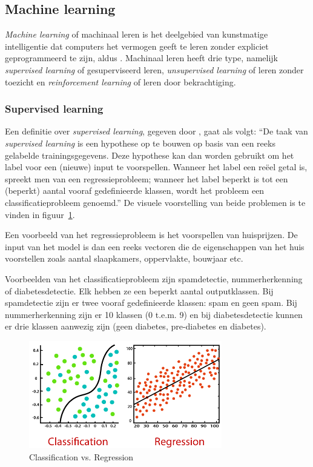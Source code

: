 \subsection{Machine learning}
\textit{Machine learning} of machinaal leren is het deelgebied van kunstmatige intelligentie dat computers het vermogen geeft te leren zonder expliciet geprogrammeerd te zijn, aldus \textcite{Lievens2021}. Machinaal leren heeft drie type, namelijk \textit{supervised learning} of gesuperviseerd leren, \textit{unsupervised learning} of leren zonder toezicht en \textit{reinforcement learning} of leren door bekrachtiging.

\subsubsection{Supervised learning}
Een definitie over \textit{supervised learning}, gegeven door \textcite{Lievens2021}, gaat als volgt: ``De taak van \textit{supervised learning} is een hypothese op te bouwen op basis van een reeks gelabelde trainingsgegevens. Deze hypothese kan dan worden gebruikt om het label voor een (nieuwe) input te voorspellen. Wanneer het label een reëel getal is, spreekt men van een regressieprobleem; wanneer het label beperkt is tot een (beperkt) aantal vooraf gedefinieerde klassen, wordt het probleem een classificatieprobleem genoemd.''
De visuele voorstelling van beide problemen is te vinden in figuur~\ref{fig:classification_vs_regression}.

Een voorbeeld van het regressieprobleem is het voorspellen van huisprijzen. De input van het model is dan een reeks vectoren die de eigenschappen van het huis voorstellen zoals aantal slaapkamers, oppervlakte, bouwjaar etc.

Voorbeelden van het classificatieprobleem zijn spamdetectie, nummerherkenning of diabetesdetectie. Elk hebben ze een beperkt aantal outputklassen. Bij spamdetectie zijn er twee vooraf gedefinieerde klassen: spam en geen spam. Bij nummerherkenning zijn er 10 klassen (0 t.e.m. 9) en bij diabetesdetectie kunnen er drie klassen aanwezig zijn (geen diabetes, pre-diabetes en diabetes).

\begin{figure}
    \centering
    \includegraphics[width=0.75\textwidth]{./img/classification_regression}
    \caption{\label{fig:classification_vs_regression} Classification vs. Regression~\autocite{JavaTpoint2021}}
\end{figure}


